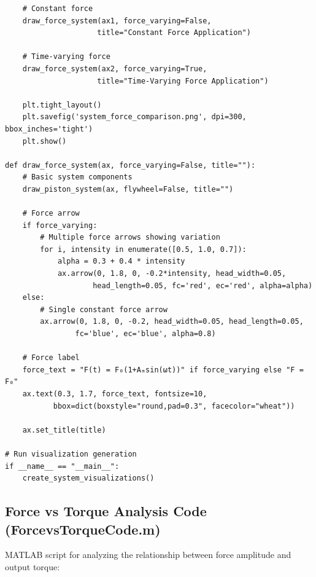 \documentclass[10pt]{article}
\begin{document}
\begin{verbatim}
    # Constant force
    draw_force_system(ax1, force_varying=False, 
                     title="Constant Force Application")
    
    # Time-varying force
    draw_force_system(ax2, force_varying=True, 
                     title="Time-Varying Force Application")
    
    plt.tight_layout()
    plt.savefig('system_force_comparison.png', dpi=300, bbox_inches='tight')
    plt.show()

def draw_force_system(ax, force_varying=False, title=""):
    # Basic system components
    draw_piston_system(ax, flywheel=False, title="")
    
    # Force arrow
    if force_varying:
        # Multiple force arrows showing variation
        for i, intensity in enumerate([0.5, 1.0, 0.7]):
            alpha = 0.3 + 0.4 * intensity
            ax.arrow(0, 1.8, 0, -0.2*intensity, head_width=0.05, 
                    head_length=0.05, fc='red', ec='red', alpha=alpha)
    else:
        # Single constant force arrow
        ax.arrow(0, 1.8, 0, -0.2, head_width=0.05, head_length=0.05, 
                fc='blue', ec='blue', alpha=0.8)
    
    # Force label
    force_text = "F(t) = F₀(1+Aₘsin(ωt))" if force_varying else "F = F₀"
    ax.text(0.3, 1.7, force_text, fontsize=10, 
           bbox=dict(boxstyle="round,pad=0.3", facecolor="wheat"))
    
    ax.set_title(title)

# Run visualization generation
if __name__ == "__main__":
    create_system_visualizations()
\end{verbatim}

\subsection{Force vs Torque Analysis Code (ForcevsTorqueCode.m)}

MATLAB script for analyzing the relationship between force amplitude and output torque:
\end{document}
